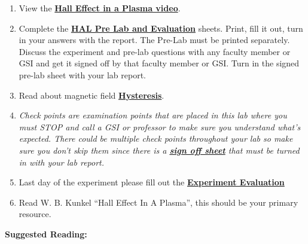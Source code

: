 \documentclass{../lab}
\begin{document}
\begin{enumerate}
    \item View the \href{http://youtu.be/iZkOlZDyb2U}{\textbf{Hall Effect in a Plasma video}}.
    \item Complete the \href{http://experimentationlab.berkeley.edu/HALPreLab}{\textbf{HAL Pre Lab and Evaluation}} sheets. Print, fill it out, turn in your answers with the report. The Pre-Lab must be printed separately. Discuss the experiment and pre-lab questions with any faculty member or GSI and get it signed off by that faculty member or GSI. Turn in the signed pre-lab sheet with your lab report.
    \item Read about magnetic field \href{http://experimentationlab.berkeley.edu/hysteresis}{\textbf{Hysteresis}}.
    \item \emph{Check points are examination points that are placed in this lab where you must STOP and call a GSI or professor to make sure you understand what's expected. There could  be multiple check points throughout your lab so make sure you don't skip them since there is a \href{http://experimentationlab.berkeley.eduhalcheckpoints}{\textbf{sign off sheet}} that must be turned in with your lab report.}
    \item Last day of the experiment please fill out the \href{\ExperimentEvaluation}{\textbf{Experiment Evaluation}}
    \item Read W. B. Kunkel ``Hall Effect In A Plasma'', this should be your primary resource.
\end{enumerate}

\textbf{Suggested Reading:}
\end{document}
